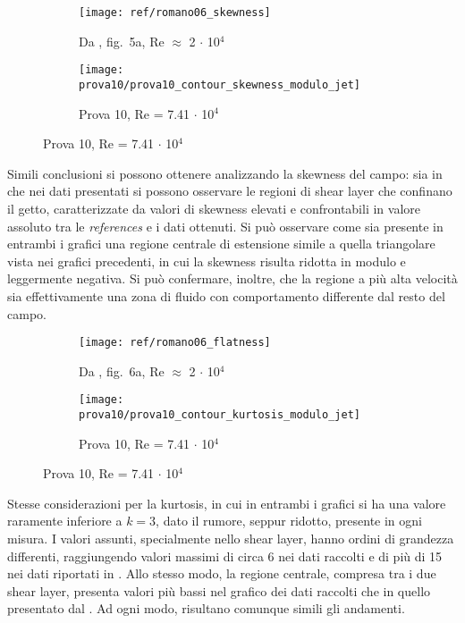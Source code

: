 \documentclass{article} %
\begin{document}
\begin{figure}[h!]
	\centering
	\begin{subfigure}{0.4\textwidth}
		\texttt{[image: ref/romano06\_skewness]}
		\caption{Da \cite{falchi09}, fig.~5a, Re $\approx$ 2 $\cdot$ 10$^4$}
	\end{subfigure}
	\begin{subfigure}{0.4\textwidth}
		\texttt{[image: prova10/prova10\_contour\_skewness\_modulo\_jet]}
		\caption{Prova 10, Re = 7.41 $\cdot$ 10$^4$}
	\end{subfigure}
\end{figure}\par
Simili conclusioni si possono ottenere analizzando la skewness del campo: sia in \cite{falchi09} che nei dati presentati si possono osservare le regioni di shear layer che confinano il getto, caratterizzate da valori di skewness elevati e confrontabili in valore assoluto tra le \textit{references} e i dati ottenuti. Si può osservare come sia presente in entrambi i grafici una regione centrale di estensione simile a quella triangolare vista nei grafici precedenti, in cui la skewness risulta ridotta in modulo e leggermente negativa. Si può confermare, inoltre, che la regione a più alta velocità sia effettivamente una zona di fluido con comportamento differente dal resto del campo.\par
\begin{figure}[h!]
	\centering
	\begin{subfigure}{0.4\textwidth}
		\texttt{[image: ref/romano06\_flatness]}
		\caption{Da \cite{falchi09}, fig.~6a, Re $\approx$ 2 $\cdot$ 10$^4$}
	\end{subfigure}
	\begin{subfigure}{0.4\textwidth}
		\texttt{[image: prova10/prova10\_contour\_kurtosis\_modulo\_jet]}
		\caption{Prova 10, Re = 7.41 $\cdot$ 10$^4$}
	\end{subfigure}
\end{figure}\par
Stesse considerazioni per la kurtosis, in cui in entrambi i grafici si ha una valore raramente inferiore a $k = 3$, dato il rumore, seppur ridotto, presente in ogni misura. I valori assunti, specialmente nello shear layer, hanno ordini di grandezza differenti, raggiungendo valori massimi di circa 6 nei dati raccolti e di più di 15 nei dati riportati in \cite{falchi09}. Allo stesso modo, la regione centrale, compresa tra i due shear layer, presenta valori più bassi nel grafico dei dati raccolti che in quello presentato dal \cite{falchi09}. Ad ogni modo, risultano comunque simili gli andamenti.\par
\end{document}
